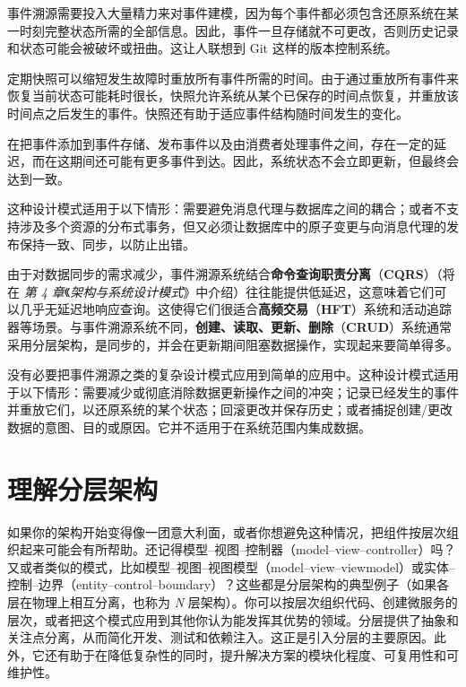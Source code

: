 
事件溯源需要投入大量精力来对事件建模，因为每个事件都必须包含还原系统在某一时刻完整状态所需的全部信息。因此，事件一旦存储就不可更改，否则历史记录和状态可能会被破坏或扭曲。这让人联想到 Git 这样的版本控制系统。

\label{idx:117}
定期快照可以缩短发生故障时重放所有事件所需的时间。由于通过重放所有事件来恢复当前状态可能耗时很长，快照允许系统从某个已保存的时间点恢复，并重放该时间点之后发生的事件。快照还有助于适应事件结构随时间发生的变化。

在把事件添加到事件存储、发布事件以及由消费者处理事件之间，存在一定的延迟，而在这期间还可能有更多事件到达。因此，系统状态不会立即更新，但最终会达到一致。

这种设计模式适用于以下情形：需要避免消息代理与数据库之间的耦合；或者不支持涉及多个资源的分布式事务，但又必须让数据库中的原子变更与向消息代理的发布保持一致、同步，以防止出错。

\label{idx:118}
\label{idx:119}
\label{idx:120}
由于对数据同步的需求减少，事件溯源系统结合\textbf{命令查询职责分离}（\textbf{CQRS}）（将在 \emph{第 4 章}《\emph{架构与系统设计模式}》中介绍）往往能提供低延迟，这意味着它们可以几乎无延迟地响应查询。这使得它们很适合\textbf{高频交易}（\textbf{HFT}）系统和活动追踪器等场景。与事件溯源系统不同，\textbf{创建、读取、更新、删除}（\textbf{CRUD}）系统通常采用分层架构，是同步的，并会在更新期间阻塞数据操作，实现起来要简单得多。

没有必要把事件溯源之类的复杂设计模式应用到简单的应用中。这种设计模式适用于以下情形：需要减少或彻底消除数据更新操作之间的冲突；记录已经发生的事件并重放它们，以还原系统的某个状态；回滚更改并保存历史；或者捕捉创建/更改数据的意图、目的或原因。它并不适用于在系统范围内集成数据。

\section{理解分层架构}

\label{idx:121}
如果你的架构开始变得像一团意大利面，或者你想避免这种情况，把组件按层次组织起来可能会有所帮助。还记得模型–视图–控制器（model–view–controller）吗？又或者类似的模式，比如模型–视图–视图模型（model–view–viewmodel）或实体–控制–边界（entity–control–boundary）？这些都是分层架构的典型例子（如果各层在物理上相互分离，也称为 \emph{N} 层架构）。你可以按层次组织代码、创建微服务的层次，或者把这个模式应用到其他你认为能发挥其优势的领域。分层提供了抽象和关注点分离，从而简化开发、测试和依赖注入。这正是引入分层的主要原因。此外，它还有助于在降低复杂性的同时，提升解决方案的模块化程度、可复用性和可维护性。

